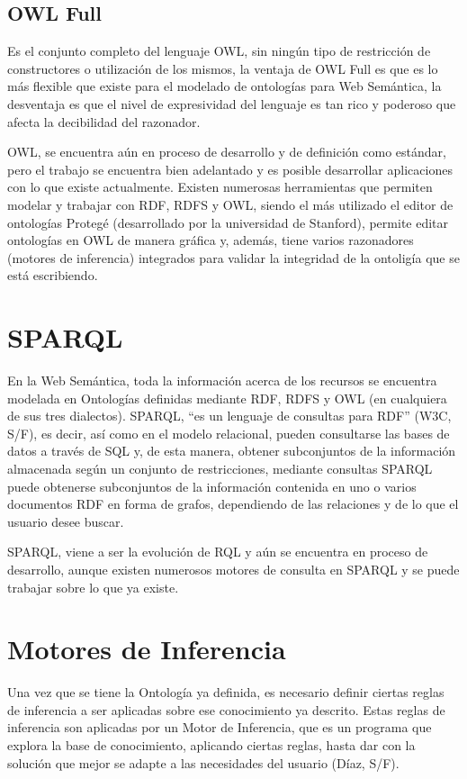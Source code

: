 \subsection{OWL Full}
Es el conjunto completo del lenguaje OWL, sin ningún tipo de restricción de constructores o utilización de los mismos, la ventaja de OWL Full es que es lo más flexible que existe para el modelado de ontologías para Web Semántica, la desventaja es que el nivel de expresividad del lenguaje es tan rico y poderoso que afecta la decibilidad del razonador.

OWL, se encuentra aún en proceso de desarrollo y de definición como estándar, pero el trabajo se encuentra bien adelantado y es posible desarrollar aplicaciones con lo que existe actualmente. Existen numerosas herramientas que permiten modelar y trabajar con RDF, RDFS y OWL, siendo el más utilizado el editor de ontologías Protegé (desarrollado por la universidad de Stanford), permite editar ontologías en OWL de manera gráfica y, además, tiene varios razonadores (motores de inferencia) integrados para validar la integridad de la ontoligía que se está escribiendo.

\section{SPARQL}

En la Web Semántica, toda la información acerca de los recursos se encuentra modelada en Ontologías definidas mediante RDF, RDFS y OWL (en cualquiera de sus tres dialectos). SPARQL, ``es un lenguaje de consultas para RDF'' (W3C, S/F), es decir, así como en el modelo relacional, pueden consultarse las bases de datos a través de SQL y, de esta manera, obtener subconjuntos de la información almacenada según un conjunto de restricciones, mediante consultas SPARQL puede obtenerse subconjuntos de la información contenida en uno o varios documentos RDF en forma de grafos, dependiendo de las relaciones y de lo que el usuario desee buscar.

SPARQL, viene a ser la evolución de RQL y aún se encuentra en proceso de desarrollo, aunque existen numerosos motores de consulta en SPARQL y se puede trabajar sobre lo que ya existe.

\section{Motores de Inferencia}

Una vez que se tiene la Ontología ya definida, es necesario definir ciertas reglas de inferencia a ser aplicadas sobre ese conocimiento ya descrito. Estas reglas de inferencia son aplicadas por un Motor de Inferencia, que es un programa que explora la base de conocimiento, aplicando ciertas reglas, hasta dar con la solución que mejor se adapte a las necesidades del usuario (Díaz, S/F).

